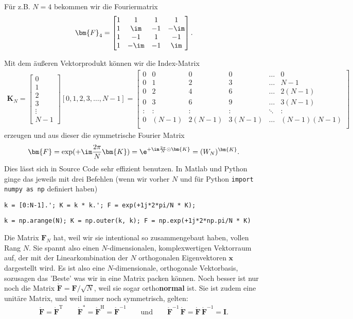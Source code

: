 \noindent Für z.B. $N=4$ bekommen wir die Fouriermatrix
\begin{align}
\bm{F}_4 =
\begin{bmatrix}
1 & 1 & 1 & 1 \\
1 & \im & -1 & -\im \\
1 & -1 & 1 & -1 \\
1 & -\im & -1 & \im
\end{bmatrix}.
\end{align}

Mit dem äußeren Vektorprodukt können wir die Index-Matrix
\begin{align}
\bm{K}_N =
\begin{bmatrix}
0\\1\\2\\3\\\vdots\\N-1
\end{bmatrix}
[0,1,2,3,\dots,N-1]
=
\begin{bmatrix}
0 & 0 & 0 & 0 & \dots & 0\\
0 & 1 & 2 & 3 & \dots & N-1\\
0 & 2 & 4 & 6 & \dots & 2(N-1)\\
0 & 3 & 6 & 9 & \dots & 3(N-1)\\
: & : & : & : & \ddots & :\\
0 & (N-1) & 2(N-1) & 3(N-1) & \dots & (N-1)(N-1)\\
\end{bmatrix}
\end{align}
erzeugen und aus dieser die symmetrische Fourier Matrix
\begin{align}
\bm{F} = \exp(+\im\frac{2\pi}{N} \bm{K}) =
\e^{+\im\frac{2\pi}{N} \odot \bm{K}} =
(W_N)^{\bm{K}}.
\end{align}
Dies lässt sich in Source Code sehr effizient benutzen. In Matlab und Python
ginge das jeweils mit drei Befehlen (wenn wir vorher $N$ und
für Python \texttt{import numpy as np} definiert haben)

\verb|k = [0:N-1].'; K = k * k.'; F = exp(+1j*2*pi/N * K);|

\verb|k = np.arange(N); K = np.outer(k, k); F = np.exp(+1j*2*np.pi/N * K)|

\noindent Die Matrix $\bm{F}_N$ hat, weil wir sie intentional so zusammengebaut haben,
vollen Rang $N$. Sie spannt also einen $N$-dimensionalen, komplexwertigen Vektorraum auf,
der mit der Linearkombination der $N$ orthogonalen Eigenvektoren $\bm{x}$
dargestellt wird. Es ist also eine $N$-dimensionale, orthogonale Vektorbasis,
sozusagen das 'Beste' was wir in eine Matrix packen können.
%
Noch besser ist nur noch die Matrix $\mathring{\bm{F}} = \bm{F}/\sqrt{N}$, weil sie sogar
ortho\textbf{normal} ist.
Sie ist zudem eine unitäre Matrix, und weil immer noch symmetrisch, gelten:
\begin{align}
\mathring{\bm{F}} = \mathring{\bm{F}}^\mathrm{T}
\qquad
\mathring{\bm{F}}^* =
\mathring{\bm{F}}^\mathrm{H} =
\mathring{\bm{F}}^{-1}
\qquad\text{und}\qquad
\mathring{\bm{F}}^{-1} \, \mathring{\bm{F}} =
\mathring{\bm{F}} \, \mathring{\bm{F}}^{-1} =
\mathbf{I}.
\end{align}


